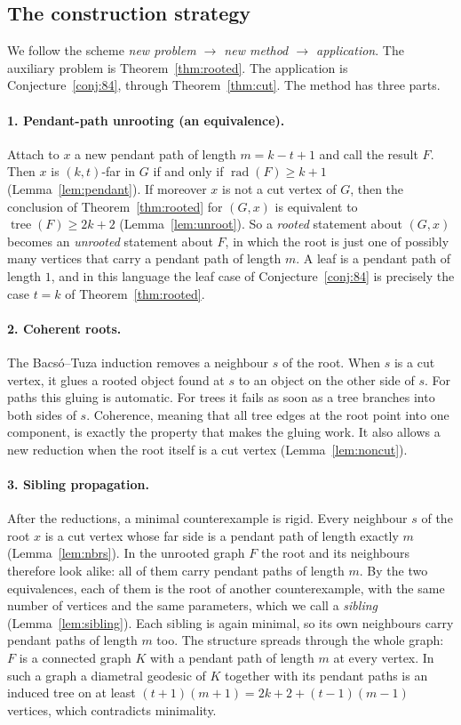 \documentclass[11pt,a4paper]{article}
\theoremstyle{remark}
\newcommand{\rad}{\operatorname{rad}}
\newcommand{\tr}{\tree}
\newcommand{\tree}{\operatorname{tree}}
\begin{document}
\subsection{The construction strategy}

We follow the scheme \emph{new problem $\to$ new method $\to$ application}. The auxiliary problem is Theorem~\ref{thm:rooted}. The application is Conjecture~\ref{conj:84}, through Theorem~\ref{thm:cut}. The method has three parts.

\paragraph{1. Pendant-path unrooting (an equivalence).} Attach to $x$ a new pendant path of length $m=k-t+1$ and call the result $F$. Then $x$ is $(k,t)$-far in $G$ if and only if $\rad(F)\ge k+1$ (Lemma~\ref{lem:pendant}). If moreover $x$ is not a cut vertex of $G$, then the conclusion of Theorem~\ref{thm:rooted} for $(G,x)$ is equivalent to $\tr(F)\ge 2k+2$ (Lemma~\ref{lem:unroot}). So a \emph{rooted} statement about $(G,x)$ becomes an \emph{unrooted} statement about $F$, in which the root is just one of possibly many vertices that carry a pendant path of length $m$. A leaf is a pendant path of length $1$, and in this language the leaf case of Conjecture~\ref{conj:84} is precisely the case $t=k$ of Theorem~\ref{thm:rooted}.

\paragraph{2. Coherent roots.} The Bacs\'o--Tuza induction removes a neighbour $s$ of the root. When $s$ is a cut vertex, it glues a rooted object found at $s$ to an object on the other side of $s$. For paths this gluing is automatic. For trees it fails as soon as a tree branches into both sides of $s$. Coherence, meaning that all tree edges at the root point into one component, is exactly the property that makes the gluing work. It also allows a new reduction when the root itself is a cut vertex (Lemma~\ref{lem:noncut}).

\paragraph{3. Sibling propagation.} After the reductions, a minimal counterexample is rigid. Every neighbour $s$ of the root $x$ is a cut vertex whose far side is a pendant path of length exactly $m$ (Lemma~\ref{lem:nbrs}). In the unrooted graph $F$ the root and its neighbours therefore look alike: all of them carry pendant paths of length $m$. By the two equivalences, each of them is the root of another counterexample, with the same number of vertices and the same parameters, which we call a \emph{sibling} (Lemma~\ref{lem:sibling}). Each sibling is again minimal, so its own neighbours carry pendant paths of length $m$ too. The structure spreads through the whole graph: $F$ is a connected graph $K$ with a pendant path of length $m$ at every vertex. In such a graph a diametral geodesic of $K$ together with its pendant paths is an induced tree on at least $(t+1)(m+1)=2k+2+(t-1)(m-1)$ vertices, which contradicts minimality.
\end{document}
